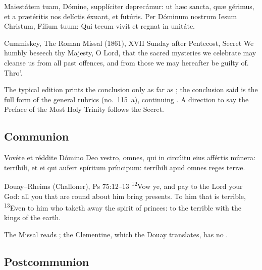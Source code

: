 
\begin{latinproper}
Maiestátem tuam, Dómine, supplíciter deprecámur: ut hæc sancta, quæ gérimus,
et a prætéritis nos delíctis éxuant, et futúris. Per Dóminum nostrum Iesum
Christum, Fílium tuum: Qui tecum vivit et regnat in unitáte.
\end{latinproper}

\begin{englishwitness}{Cummiskey, The Roman Missal (1861), XVII Sunday after Pentecost, Secret}
We humbly beseech thy Majesty, O Lord, that the sacred mysteries we celebrate
may cleanse us from all past offences, and from those we may hereafter be
guilty of. Thro'.
\end{englishwitness}

\noindent The typical edition prints the conclusion only as far as ;
the conclusion said is the full form of the general rubrics (no.~115~a),
continuing .
A direction to say the Preface of the Most Holy Trinity follows the Secret.

\subsection{Communion}
\label{proper-communion}


\begin{latinproper}
Vovéte et réddite Dómino Deo vestro, omnes, qui in circúitu eius affértis
múnera: terríbili, et ei qui aufert spíritum príncipum: terríbili apud omnes
reges terræ.
\end{latinproper}

\begin{englishwitness}{Douay--Rheims (Challoner), Ps 75:12--13}
\textsuperscript{12}Vow ye, and pay to the Lord your God: all you that are
round about him bring presents. To him that is terrible,
\textsuperscript{13}Even to him who taketh away the spirit of princes: to the
terrible with the kings of the earth.
\end{englishwitness}

\noindent The Missal reads ; the Clementine, which the
Douay translates, has no .

\subsection{Postcommunion}
\label{proper-postcommunion}

